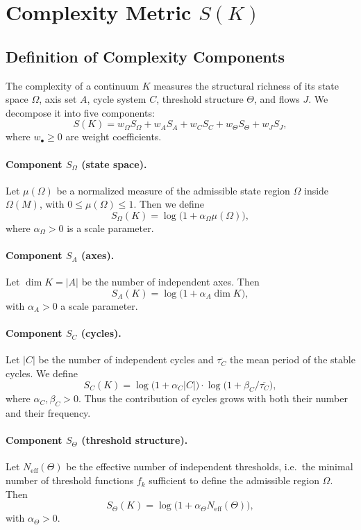 \section{Complexity Metric \texorpdfstring{\(S(K)\)}{S(K)}}
\label{sec:complexity-S}

\subsection{Definition of Complexity Components}

The complexity of a continuum \(K\) measures the structural richness of its state space \(\Omega\), axis set \(A\), cycle system \(C\), threshold structure \(\Theta\), and flows \(J\).
We decompose it into five components:
\[
  S(K)=w_\Omega S_\Omega + w_A S_A + w_C S_C + w_\Theta S_\Theta + w_J S_J,
\]
where \(w_\bullet\ge 0\) are weight coefficients.

\paragraph{Component \texorpdfstring{\(S_\Omega\)}{S_\Omega} (state space).}
Let \(\mu(\Omega)\) be a normalized measure of the admissible state region \(\Omega\) inside \(\Omega(M)\), with \(0\le\mu(\Omega)\le 1\).
Then we define
\[
  S_\Omega(K) = \log\bigl(1+\alpha_\Omega \mu(\Omega)\bigr),
\]
where \(\alpha_\Omega>0\) is a scale parameter.

\paragraph{Component \texorpdfstring{\(S_A\)}{S_A} (axes).}
Let \(\dim K = |A|\) be the number of independent axes.
Then
\[
  S_A(K) = \log\bigl(1+\alpha_A \dim K\bigr),
\]
with \(\alpha_A>0\) a scale parameter.

\paragraph{Component \texorpdfstring{\(S_C\)}{S_C} (cycles).}
Let \(|C|\) be the number of independent cycles and \(\overline{\tau_C}\) the mean period of the stable cycles.
We define
\[
  S_C(K) = \log\bigl(1+\alpha_C |C|\bigr)\cdot \log\bigl(1+\beta_C/\overline{\tau_C}\bigr),
\]
where \(\alpha_C,\beta_C>0\).
Thus the contribution of cycles grows with both their number and their frequency.

\paragraph{Component \texorpdfstring{\(S_\Theta\)}{S_\Theta} (threshold structure).}
Let \(N_{\mathrm{eff}}(\Theta)\) be the effective number of independent thresholds, i.e.\ the minimal number of threshold functions \(f_k\) sufficient to define the admissible region \(\Omega\).
Then
\[
  S_\Theta(K) = \log\bigl(1+\alpha_\Theta N_{\mathrm{eff}}(\Theta)\bigr),
\]
with \(\alpha_\Theta>0\).

